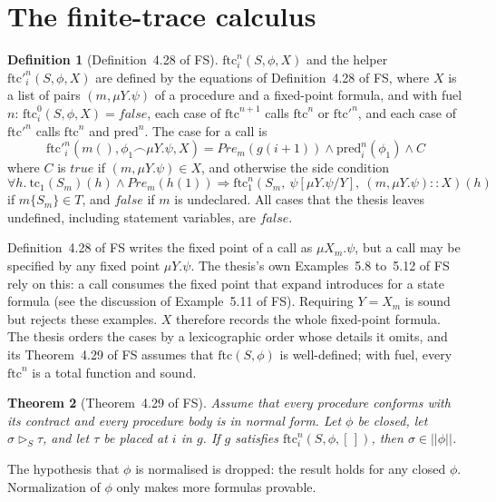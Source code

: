 \documentclass[11pt]{article}
\newcommand{\fsem}[1]{|\!|#1|\!|}
\newcommand{\chop}{\smallfrown}
\newcommand{\call}[1]{#1()}
\newcommand{\Pre}{\mathit{Pre}}
\newcommand{\tc}{\mathrm{tc}}
\newcommand{\ftc}{\mathrm{ftc}}
\newcommand{\pred}{\mathrm{pred}}
\newcommand{\eff}{\rhd}
\newcommand{\Th}[1]{#1 of FS}
\theoremstyle{plain}
\newtheorem{theorem}{Theorem}[section]
\theoremstyle{definition}
\newtheorem{definition}[theorem]{Definition}
\theoremstyle{remark}
\begin{document}
\section{The finite-trace calculus}

\begin{definition}[\Th{Definition~4.28}]\label{def:ftc}
  $\ftc^n_i(S, \phi, X)$ and the helper $\ftc'^n_i(S, \phi, X)$ are defined
  by the equations of \Th{Definition~4.28}, where $X$ is a list of pairs
  $(m, \mu Y.\psi)$ of a procedure and a fixed-point formula, and with fuel
  $n$: $\ftc^0_i(S, \phi, X) = \mathit{false}$,
  each case of $\ftc^{n+1}$ calls $\ftc^n$ or $\ftc'^n$, and each case of
  $\ftc'^n$ calls $\ftc^n$ and $\pred^n$. The case for a call is
  \[
    \ftc'^n_i(\call{m}, \phi_1\chop\mu Y.\psi, X) =
    \Pre_m(g(i+1)) \land \pred^n_i(\phi_1) \land C
  \]
  where $C$ is $\mathit{true}$ if $(m, \mu Y.\psi) \in X$, and otherwise the
  side condition
  \[
    \forall h.\ \tc_1(S_m)(h) \land \Pre_m(h(1)) \Rightarrow
      \ftc^n_1(S_m,\ \psi[\mu Y.\psi/Y],\ (m, \mu Y.\psi) :: X)(h)
  \]
  if $m\{S_m\} \in T$, and $\mathit{false}$ if $m$ is undeclared. All cases
  that the thesis leaves undefined, including statement variables, are
  $\mathit{false}$.
\end{definition}

\Th{Definition~4.28} writes the fixed point of a call as $\mu X_m.\psi$,
but a call may be specified by any fixed point $\mu Y.\psi$. The thesis's
own \Th{Examples~5.8 to~5.12} rely on this: a call consumes the fixed point
that $\mathrm{expand}$ introduces for a state formula (see the discussion
of \Th{Example~5.11}). Requiring $Y = X_m$ is sound but rejects these
examples. $X$ therefore records the whole fixed-point formula. The thesis
orders the cases by a lexicographic order
whose details it omits, and its \Th{Theorem~4.29} assumes that
$\ftc(S, \phi)$ is well-defined; with fuel, every $\ftc^n$ is a total
function and sound.

\begin{theorem}[\Th{Theorem~4.29}]\label{thm:ftc}
  Assume that every procedure conforms with its contract and every
  procedure body is in normal form. Let $\phi$ be closed, let
  $\sigma \eff_S \tau$, and let $\tau$ be placed at $i$ in $g$. If $g$
  satisfies $\ftc^n_i(S, \phi, [\,])$, then $\sigma \in \fsem{\phi}$.
\end{theorem}

The hypothesis that $\phi$ is normalised is dropped: the result holds for
any closed $\phi$. Normalization of $\phi$ only makes more formulas
provable.
\end{document}
